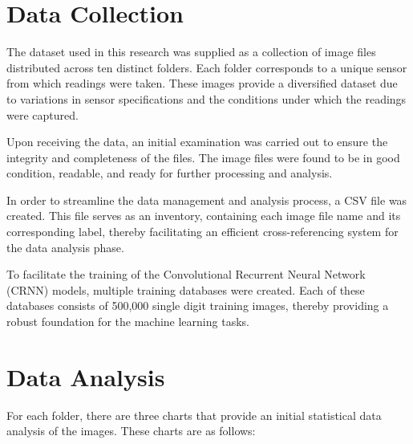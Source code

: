 \section{Data Collection}

The dataset used in this research was supplied as a collection of image files distributed across ten distinct folders. Each folder corresponds to a unique sensor from which readings were taken. These images provide a diversified dataset due to variations in sensor specifications and the conditions under which the readings were captured.

Upon receiving the data, an initial examination was carried out to ensure the integrity and completeness of the files. The image files were found to be in good condition, readable, and ready for further processing and analysis.

In order to streamline the data management and analysis process, a CSV file was created. This file serves as an inventory, containing each image file name and its corresponding label, thereby facilitating an efficient cross-referencing system for the data analysis phase.

To facilitate the training of the Convolutional Recurrent Neural Network (CRNN) models, multiple training databases were created. Each of these databases consists of 500,000 single digit training images, thereby providing a robust foundation for the machine learning tasks.

\newpage
\section{Data Analysis}

For each folder, there are three charts that provide an initial statistical data analysis of the images. These charts are as follows:


